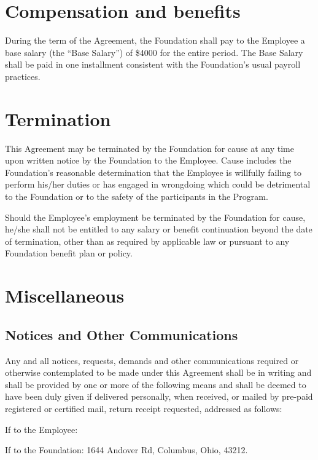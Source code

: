 \documentclass{ross}
\begin{document}
\section{Compensation and benefits}

During the term of the Agreement, the Foundation shall pay to the
Employee a base salary (the ``Base Salary'') of \$4000 for the entire
period.  The Base Salary shall be paid in one installment consistent with
the Foundation's usual payroll practices.

\section{Termination}

This Agreement may be terminated by the Foundation for cause at any time upon written notice by the Foundation to the Employee.  Cause includes the Foundation's reasonable determination that the Employee is willfully failing to perform his/her duties or has engaged in wrongdoing which could be detrimental to the Foundation or to the safety of the participants in the Program.

Should the Employee's employment be terminated by the Foundation for cause, he/she shall not be entitled to any salary or benefit continuation beyond the date of termination, other than as required by applicable law or pursuant to any Foundation benefit plan or policy.

\section{Miscellaneous}

\subsection{Notices and Other Communications}

Any and all notices, requests, demands and other communications required or 
otherwise contemplated to be made under this Agreement shall be in writing 
and shall be provided by one or more of the following means and shall be 
deemed to have been duly given  if delivered personally, when received, 
or mailed by pre-paid registered or certified mail, return receipt requested, 
addressed as follows:

If to the Employee: 

If to the Foundation: 1644 Andover Rd, Columbus, Ohio, 43212.
\end{document}
